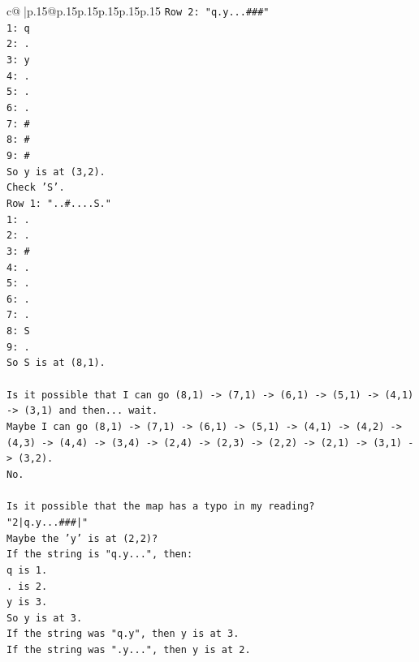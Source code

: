 \documentclass{article}
\begin{document}
{\begin{supertabular}{c@{$\;$}|p{.15\linewidth}@{}p{.15\linewidth}p{.15\linewidth}p{.15\linewidth}p{.15\linewidth}p{.15\linewidth}}
{{{\texttt{Row 2: "q.y...\#\#\#"} \\
\texttt{1: q} \\
\texttt{2: .} \\
\texttt{3: y} \\
\texttt{4: .} \\
\texttt{5: .} \\
\texttt{6: .} \\
\texttt{7: \#} \\
\texttt{8: \#} \\
\texttt{9: \#} \\
\texttt{So y is at (3,2).} \\
\texttt{Check 'S'.} \\
\texttt{Row 1: "..\#....S."} \\
\texttt{1: .} \\
\texttt{2: .} \\
\texttt{3: \#} \\
\texttt{4: .} \\
\texttt{5: .} \\
\texttt{6: .} \\
\texttt{7: .} \\
\texttt{8: S} \\
\texttt{9: .} \\
\texttt{So S is at (8,1).} \\
\\ 
\texttt{Is it possible that I can go (8,1) {-}> (7,1) {-}> (6,1) {-}> (5,1) {-}> (4,1) {-}> (3,1) and then... wait.} \\
\texttt{Maybe I can go (8,1) {-}> (7,1) {-}> (6,1) {-}> (5,1) {-}> (4,1) {-}> (4,2) {-}> (4,3) {-}> (4,4) {-}> (3,4) {-}> (2,4) {-}> (2,3) {-}> (2,2) {-}> (2,1) {-}> (3,1) {-}> (3,2).} \\
\texttt{No.} \\
\\ 
\texttt{Is it possible that the map has a typo in my reading?} \\
\texttt{"2|q.y...\#\#\#|"} \\
\texttt{Maybe the 'y' is at (2,2)?} \\
\texttt{If the string is "q.y...", then:} \\
\texttt{q is 1.} \\
\texttt{. is 2.} \\
\texttt{y is 3.} \\
\texttt{So y is at 3.} \\
\texttt{If the string was "q.y", then y is at 3.} \\
\texttt{If the string was ".y...", then y is at 2.} \\
}}}
\end{supertabular}}
\end{document}

